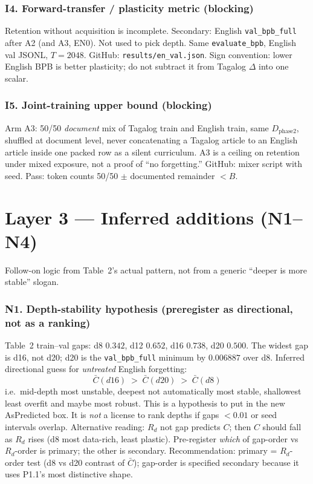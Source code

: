 \documentclass[11pt,a4paper]{article}
\begin{document}
\subsubsection*{I4. Forward-transfer / plasticity metric (blocking)}
Retention without acquisition is incomplete. Secondary: English \texttt{val\_bpb\_full} after A2 (and A3, EN0). Not used to pick depth. Same \texttt{evaluate\_bpb}, English val JSONL, $T=2048$. GitHub: \texttt{results/en\_val.json}. Sign convention: lower English BPB is better plasticity; do not subtract it from Tagalog $\Delta$ into one scalar.

\subsubsection*{I5. Joint-training upper bound (blocking)}
Arm A3: 50/50 \emph{document} mix of Tagalog train and English train, same $D_{\mathrm{phase2}}$, shuffled at document level, never concatenating a Tagalog article to an English article inside one packed row as a silent curriculum. A3 is a ceiling on retention under mixed exposure, not a proof of ``no forgetting.'' GitHub: mixer script with seed. Pass: token counts 50/50 $\pm$ documented remainder $<B$.

\section{Layer 3 --- Inferred additions (N1--N4)}
\label{sec:L3}

Follow-on logic from Table~2's actual pattern, not from a generic ``deeper is more stable'' slogan.

\subsubsection*{N1. Depth-stability hypothesis (preregister as directional, not as a ranking)}
Table~2 train--val gaps: d8 $0.342$, d12 $0.652$, d16 $0.738$, d20 $0.500$. The widest gap is d16, not d20; d20 is the \texttt{val\_bpb\_full} minimum by $0.006887$ over d8. Inferred directional guess for \emph{untreated} English forgetting:
\[
\bar C(d16)\;>\;\bar C(d20)\;>\;\bar C(d8)
\]
i.e.\ mid-depth most unstable, deepest not automatically most stable, shallowest least overfit and maybe most robust. This is a hypothesis to put in the new AsPredicted box. It is \emph{not} a license to rank depths if gaps $<0.01$ or seed intervals overlap. Alternative reading: $R_d$ not gap predicts $C$; then $C$ should fall as $R_d$ rises (d8 most data-rich, least plastic). Pre-register \emph{which} of gap-order vs $R_d$-order is primary; the other is secondary. Recommendation: primary = $R_d$-order test (d8 vs d20 contrast of $\bar C$); gap-order is specified secondary because it uses P1.1's most distinctive shape.
\end{document}
